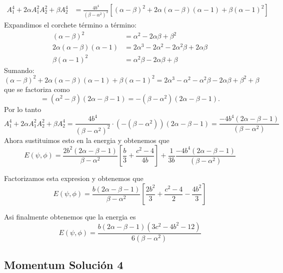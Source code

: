 \documentclass[letterpaper,11pt]{exam}
\theoremstyle{plain}
\begin{document}
\begin{align*}
A_1^4 + 2\alpha A_1^2A_2^2 + \beta A_2^4 
&= \frac{4b^4}{(\beta-\alpha^2)^2}\left[(\alpha-\beta)^2 + 2\alpha(\alpha-\beta)(\alpha-1) 
   + \beta(\alpha-1)^2\right]
\end{align*}
Expandimos el corchete término a término:
\begin{align*}
(\alpha-\beta)^2 &= \alpha^2 - 2\alpha\beta + \beta^2 \\
2\alpha(\alpha-\beta)(\alpha-1) &= 2\alpha^3 - 2\alpha^2 - 2\alpha^2\beta + 2\alpha\beta \\
\beta(\alpha-1)^2 &= \alpha^2\beta - 2\alpha\beta + \beta
\end{align*}
Sumando:
\begin{equation*}
(\alpha-\beta)^2 + 2\alpha(\alpha-\beta)(\alpha-1) + \beta(\alpha-1)^2 
= 2\alpha^3 - \alpha^2 - \alpha^2\beta - 2\alpha\beta + \beta^2 + \beta
\end{equation*}
que se factoriza como
\begin{equation*}
= (\alpha^2-\beta)(2\alpha-\beta-1) = -(\beta-\alpha^2)(2\alpha-\beta-1).
\end{equation*}
Por lo tanto
\begin{equation*}
A_1^4 + 2\alpha A_1^2A_2^2 + \beta A_2^4 
= \frac{4b^4}{(\beta-\alpha^2)^2}\cdot(-(\beta-\alpha^2))(2\alpha-\beta-1) 
= \frac{-4b^4(2\alpha-\beta-1)}{(\beta-\alpha^2)}
\end{equation*}
Ahora sustituimos esto en la energia y obtenemos que 
\begin{equation}
    E(\psi,\phi)=\frac{2b^2(2\alpha-\beta-1)}{\beta-\alpha^2}\left [ \frac{b}{3} + \frac{c^2-4}{4b}\right]+\frac{1}{3b}\frac{-4b^4(2\alpha-\beta-1)}{(\beta-\alpha^2)}
\end{equation}

Factorizamos esta expresion y obtenemos que 
\begin{equation*}
    E(\psi,\phi)=\frac{b(2\alpha-\beta-1)}{\beta-\alpha^2}\left [\frac{2b^2}{3} +\frac{c^2-4}{2}-\frac{4b^2}{3}\right]
\end{equation*}

Asi finalmente obtenemos que la energia es 
\begin{equation*}
    E(\psi,\phi)=\frac{b(2\alpha-\beta-1)(3c^2-4b^2-12)}{6(\beta-\alpha^2)}
\end{equation*}

\subsection{Momentum Solución 4}
\end{document}

